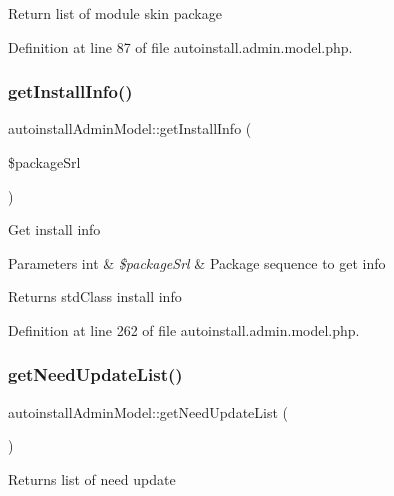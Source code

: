 Return list of module skin package 

Definition at line 87 of file autoinstall.\+admin.\+model.\+php.

\hypertarget{classautoinstallAdminModel_a8824834dd97b7e69b74af51778d27ed6}{}\label{classautoinstallAdminModel_a8824834dd97b7e69b74af51778d27ed6} 
\subsubsection{\texorpdfstring{get\+Install\+Info()}{getInstallInfo()}}
{\footnotesize\ttfamily autoinstall\+Admin\+Model\+::get\+Install\+Info (\begin{DoxyParamCaption}\item[{}]{\$package\+Srl }\end{DoxyParamCaption})}

Get install info


\begin{DoxyParams}[1]{Parameters}
int & {\em \$package\+Srl} & Package sequence to get info \\
\hline
\end{DoxyParams}
\begin{DoxyReturn}{Returns}
std\+Class install info 
\end{DoxyReturn}


Definition at line 262 of file autoinstall.\+admin.\+model.\+php.

\hypertarget{classautoinstallAdminModel_a6bba9a390c1274bc3c39a39310781b01}{}\label{classautoinstallAdminModel_a6bba9a390c1274bc3c39a39310781b01} 
\subsubsection{\texorpdfstring{get\+Need\+Update\+List()}{getNeedUpdateList()}}
{\footnotesize\ttfamily autoinstall\+Admin\+Model\+::get\+Need\+Update\+List (\begin{DoxyParamCaption}{ }\end{DoxyParamCaption})}

Returns list of need update 

